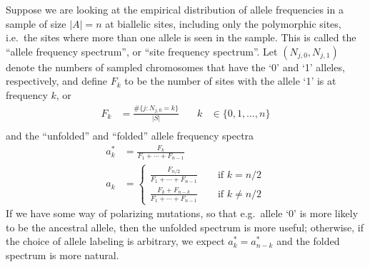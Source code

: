 Suppose we are looking at the empirical distribution of allele frequencies in a sample of size $|A|=n$
at biallelic sites, including only the polymorphic sites, i.e.\ the sites where more than one allele is seen in the sample.
This is called the ``allele frequency spectrum'', or ``site frequency spectrum''.
Let $(N_{j,0},N_{j,1})$ denote the numbers of sampled chromosomes that have the `0' and `1' alleles, respectively,
and define $F_k$ to be the number of sites with the allele `1' is at frequency $k$, or
\begin{align}
  F_k &= \frac{ \#\{ j : N_{j,0} = k \} }{ |S| } \quad & k &\in \{0,1,\ldots,n\} \\
\end{align}
and the ``unfolded'' and ``folded'' allele frequency spectra 
\begin{align}
  a_k^* &= \frac{ F_k }{ F_1 + \cdots + F_{n-1} } \\
  a_k &= \begin{cases} 
    \frac{ F_{n/2} }{ F_1 + \cdots + F_{n-1} } \qquad \text{if } k = n/2 \\
    \frac{ F_k + F_{n-k} }{ F_1 + \cdots + F_{n-1} } \qquad \text{if } k \neq n/2 
  \end{cases} 
\end{align}
If we have some way of polarizing mutations, so that e.g.\ allele `0' is more likely to be the ancestral allele,
then the unfolded spectrum is more useful;
otherwise, if the choice of allele labeling is arbitrary, 
we expect $a_k^* = a_{n-k}^*$ and the folded spectrum is more natural.

